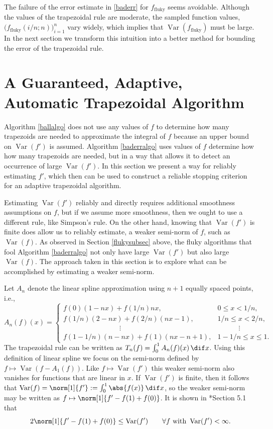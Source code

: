 \documentclass[]{article}
\DeclareMathOperator{\Var}{Var}
\theoremstyle{definition}
\theoremstyle{remark}
\begin{document}
The failure of the error estimate in \eqref{baderr} for $f_{\text{fluky}}$ seems avoidable. Although the values of the trapezoidal rule are moderate, the sampled function values, $\bigl(f_{\text{fluky}}(i/n;n)\bigr)_{i=1}^{n}$ vary widely, which implies that $\Var(f_{\text{fluky}})$ must be large.  In the next section we transform this intuition into a better method for bounding the error of the trapezoidal rule.


\section{A Guaranteed, Adaptive, Automatic Trapezoidal Algorithm} \label{newalgosec}

Algorithm \ref{ballalgo} does not use any values of $f$ to determine how many trapezoids are needed to approximate the integral of $f$ because an upper bound on $\Var(f')$ is assumed.  Algorithm \ref{baderralgo} uses values of $f$ determine how how many trapezoids are needed, but in a way that allows it to detect an occurrence of large $\Var(f')$.  In this section we present a way for reliably estimating $f'$, which then can be used to construct a reliable stopping criterion for an adaptive trapezoidal algorithm.

Estimating $\Var(f')$ reliably and directly requires additional smoothness assumptions on $f$, but if we assume more smoothness, then we ought to use a different rule, like Simpson's rule.  On the other hand, knowing that $\Var(f')$ is finite does allow us to reliably estimate, a weaker semi-norm of $f$, such as $\Var(f)$.  As observed in Section \ref{flukysubsec} above, the fluky algorithms that fool Algorithm \ref{baderralgo} not only have large $\Var(f')$ but also large $\Var(f)$.  The approach taken in this section is to explore what can be accomplished by estimating a weaker semi-norm.

Let $A_n$ denote the linear spline approximation using $n+1$ equally spaced points, i.e., 
\begin{equation}
\label{Andef}
A_n(f)(x) = \begin{cases} f(0)(1-nx) + f(1/n)nx, & 0 \le x < 1/n, \\
f(1/n)(2-nx) + f(2/n)(nx-1), & 1/n \le x < 2/n, \\
\qquad \qquad \qquad \qquad \vdots & \qquad \quad \vdots \\
f(1-1/n)(n-nx) + f(1)(nx-n + 1), & 1-1/n \le x \le 1.
\end{cases}
\end{equation}   
The trapezoidal rule can be written as $T_n(f) = \int_0^1 A_n(f)(x) \, \dif x$.  Using this definition of linear spline we focus on the semi-norm defined by $f \mapsto \Var(f-A_1(f))$.  Like $f \mapsto \Var(f')$ this weaker semi-norm also vanishes for functions that are linear in $x$.  If $\Var(f')$ is finite, then it follows that $\Var(f) = \norm[1]{f'}:=\int_0^1 \abs{f(x)} \, \dif x$, so the weaker semi-norm may be written as $f \mapsto \norm[1]{f'-f(1)+f(0)}$.  It is shown in *{Section 5.1} that 
\begin{equation} \label{weaknorm}
2 \norm[1]{f'-f(1)+f(0)} \le \Var(f') \qquad \forall f \text{ with } \Var(f')<\infty.
\end{equation}
\end{document}
